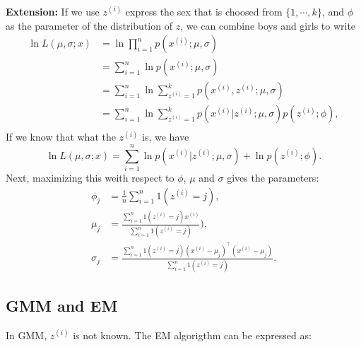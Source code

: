 \documentclass[10pt,onecolumn]{book}
\begin{document}
\textbf{Extension: } If we use $z^{(i)}$ express the sex that is choosed from $\{1, \cdots, k\}$, and $\phi$ as the parameter of the distribution of $z$, we can combine boys and girls to write 
\begin{equation}
\begin{split}
\ln L(\mu, \sigma; x) &= \ln \prod_{i=1}^n p(x^{(i)};\mu, \sigma) \\
	&= \sum_{i=1}^n \ln p(x^{(i)};\mu, \sigma)  \\
	&= \sum_{i=1}^n \ln \sum_{z^{(i)}=1}^k p(x^{(i)}, z^{(i)};\mu, \sigma)  \\
	&= \sum_{i=1}^n \ln \sum_{z^{(i)}=1}^k p(x^{(i)}| z^{(i)};\mu, \sigma) p(z^{(i)}; \phi),   \\
\end{split}
\end{equation}
If we know that what the $z^{(i)}$ is, we have 
\begin{equation}
\ln L(\mu, \sigma; x) = \sum_{i=1}^n \ln p(x^{(i)} | z^{(i)}; \mu, \sigma) + \ln p(z^{(i)}; \phi).
\end{equation}
Next, maximizing this weith respect to $\phi$, $\mu$ and $\sigma$ gives the parameters:
\begin{equation}
\begin{split}
\phi_j &= \frac{1}{n} \sum_{i=1}^n 1(z^{(i)} = j), \\
\mu_j &= \frac{\sum_{i=1}^n 1(z^{(i)} = j) x^{(i)}}{\sum_{i=1}^n 1({z^{(i)}=j})}), \\
\sigma_j &= \frac{\sum_{i=1}^n 1(z^{(i)} = j) (x^{(i)}-\mu_j)^\top (x^{(i)}-\mu_j)}{\sum_{i=1}^n 1({z^{(i)}=j})}.
\end{split}
\end{equation}

\subsection{GMM and EM}
In GMM, $z^{(i)}$ is not known. The EM algorigthm can be expressed as:
\end{document}
